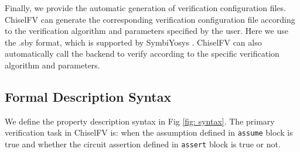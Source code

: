\documentclass[conference]{IEEEtran}
\theoremstyle{definition}
\begin{document}
Finally, we provide the automatic generation of verification configuration files.
ChiselFV can generate the corresponding verification configuration file according to the verification algorithm and parameters specified by the user. Here we use the .sby format, which is supported by SymbiYosys \cite{SymbiYosys}. ChiselFV can also automatically call the backend to verify according to the specific verification algorithm and parameters.

\subsection{Formal Description Syntax}

We define the property description syntax in Fig \ref{fig: syntax}.
The primary verification task in ChiselFV is: when the assumption defined in \verb|assume| block is true and whether the circuit assertion defined in \verb|assert| block is true or not. 
\end{document}
